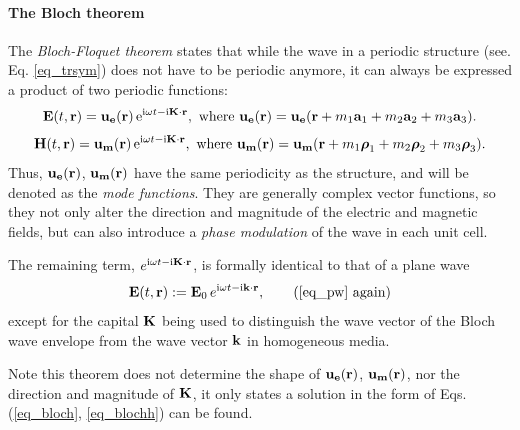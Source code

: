 \paragraph{The Bloch theorem}%
The \textit{Bloch-Floquet theorem} states that while the wave in a periodic structure (see. Eq. \ref{eq_trsym}) does not have to be periodic anymore, it can always be expressed a product of two periodic functions:
\begin{equation} 
\mathbf{E}(t, {\mathbf{r}}) = \mathbf{u_e}({\mathbf{r}})\,\mathrm{e}^{{\mathrm i}\omega t - {\mathrm i}{\mathbf{K}}\cdot{\mathbf{r}}}, \text{ where } \mathbf{u_e}({\mathbf{r}}) = \mathbf{u_e}({\mathbf{r}} + m_1 \mathbf{a}_1 + m_2 \mathbf{a}_2 + m_3 \mathbf{a}_3).
\label{eq_bloch}\end{equation} 
\begin{equation}
\mathbf{H}(t, {\mathbf{r}}) = \mathbf{u_m}({\mathbf{r}})\,\mathrm{e}^{{\mathrm i}\omega t - {\mathrm i}{\mathbf{K}}\cdot{\mathbf{r}}}, \text{ where } \mathbf{u_m}({\mathbf{r}}) = \mathbf{u_m}({\mathbf{r}} + m_1 \boldsymbol{\rho}_1 + m_2 \boldsymbol{\rho}_2 + m_3 \boldsymbol{\rho}_3).
\label{eq_blochh}\end{equation} 
Thus, $\mathbf{u_e}({\mathbf{r}})$, $\mathbf{u_m}({\mathbf{r}})$ have the same periodicity as the structure, and will be denoted as the \textit{mode functions}. They are generally complex vector functions, so they not only alter the direction and magnitude of the electric and magnetic fields, but can also introduce a \textit{phase modulation} of the wave in each unit cell. 

The remaining term, $e^{{\mathrm i}\omega t - {\mathrm i}{\mathbf{K}}\cdot{\mathbf{r}}}$, is formally identical to that of a plane wave
\begin{equation} \E(t, \rr) := \E_0\, e^{\ii\omega t - \ii\kk\cdot\rr}, \tag{\ref{eq_pw} \again} \end{equation}
except for the capital ${\mathbf{K}}$ being used to distinguish the wave vector of the Bloch wave envelope from the wave vector ${\mathbf{k}}$ in homogeneous media. 

Note this theorem does not determine the shape of $\mathbf{u_e}({\mathbf{r}})$, $\mathbf{u_m}({\mathbf{r}})$, nor the direction and magnitude of ${\mathbf{K}}$, it only states a solution in the form of Eqs. (\ref{eq_bloch}, \ref{eq_blochh}) can be found.

